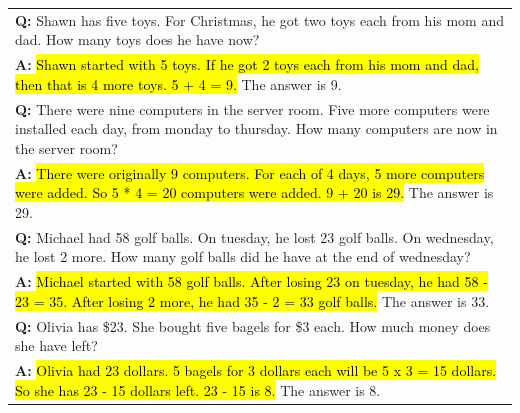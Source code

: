 \documentclass[]{article}
\theoremstyle{plain}
\theoremstyle{definition}
\theoremstyle{remark}
\begin{document}
\begin{table}[H]
\begin{tabular}{p{\linewidth}}
        \vspace{0mm}
        \textbf{Q:} Shawn has five toys. For Christmas, he got two toys each from his mom and dad. How many toys does he have now? \\
        \vspace{-1mm}
        \textbf{A:} \hl{Shawn started with 5 toys. If he got 2 toys each from his mom and dad, then that is 4 more toys. 5 + 4 = 9.} The answer is 9. \\
        \vspace{0mm}
        \textbf{Q:} There were nine computers in the server room. Five more computers were installed each day, from monday to thursday. How many computers are now in the server room? \\
        \vspace{-1mm}
        \textbf{A:} \hl{There were originally 9 computers. For each of 4 days, 5 more computers were added. So 5 * 4 = 20 computers were added. 9 + 20 is 29.} The answer is 29. \\
        \vspace{0mm}
        \textbf{Q:} Michael had 58 golf balls. On tuesday, he lost 23 golf balls. On wednesday, he lost 2 more. How many golf balls did he have at the end of wednesday? \\
        \vspace{-1mm}
        \textbf{A:} \hl{Michael started with 58 golf balls. After losing 23 on tuesday, he had 58 - 23 = 35. After losing 2 more, he had 35 - 2 = 33 golf balls.} The answer is 33. \\
        \vspace{0mm}
        \textbf{Q:} Olivia has \$23. She bought five bagels for \$3 each. How much money does she have left? \\
        \vspace{-1mm}
        \textbf{A:} \hl{Olivia had 23 dollars. 5 bagels for 3 dollars each will be 5 x 3 = 15 dollars. So she has 23 - 15 dollars left. 23 - 15 is 8.} The answer is 8. \\
        \bottomrule
    \end{tabular}
    \label{tab:appendix-mwp-prompts}
\end{table}
\endgroup
\begingroup
\end{document}

